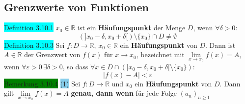 \documentclass[landscape, 10pt]{article}
\newcommand{\R}{\mathbb{R}}
\begin{document}
\begin{multicols}{3}
       \subsection{Grenzwerte von Funktionen}
              \colorbox{cyan}{Definition 3.10.1}
                     \textcolor{NavyBlue}{$x_0\in\R$} 
                     ist ein \textbf{Häufungspunkt} 
                     der Menge \textcolor{NavyBlue}{$D$}, 
                     wenn \textcolor{NavyBlue}{
                     $\forall\delta>0$}:
                     \begin{equation*}
                            (]x_0-\delta,x_0+\delta[)
                            \setminus\{x_0\}\cap D\neq\emptyset  
                     \end{equation*}
              \colorbox{cyan}{Definition 3.10.3}
                     Sei \textcolor{NavyBlue}{
                     $f:D\longrightarrow\R,\,x_0\in\R$}
                     ein \textbf{Häufungspunkt} von 
                     \textcolor{NavyBlue}{$D$}.
                     Dann ist \textcolor{NavyBlue}{$A\in\R$} 
                     der Grenzwert von 
                     \textcolor{NavyBlue}{$f(x)$} für 
                     \textcolor{NavyBlue}{$x\to x_0$}, 
                     bezeichnet mit 
                     \textcolor{NavyBlue}{
                     $\lim\limits_{x\to x_0}f(x)=A$}, 
                     wenn \textcolor{NavyBlue}{
                     $\forall\varepsilon>0\,\exists\delta>0$}, 
                     so dass 
                     \textcolor{NavyBlue}{
                     $\forall x\in 
                     D\cap(]x_0-\delta,x_0+\delta[
                     \setminus\{x_0\})$}:
                     \begin{equation*}
                            |f(x)-A|<\varepsilon
                     \end{equation*}
              \colorbox{green}{Bemerkung 3.10.4} 
                     \colorbox{SkyBlue}{(1)} Sei 
                     \textcolor{NavyBlue}{
                            $f:D\longrightarrow\R$} und 
                            \textcolor{NavyBlue}{$x_0$} ein 
                            \textbf{Häufungspunkt} von 
                            \textcolor{NavyBlue}{$D$}. 
                            Dann gilt 
                            \textcolor{NavyBlue}{
                            $\lim\limits_{x\to x_0}f(x)=A$} 
                            \textbf{genau, dann wenn} für 
                            jede Folge 
                            \textcolor{NavyBlue}{
                            $(a_n)_{n\geqslant1}$} 

\end{multicols}
\end{document}
